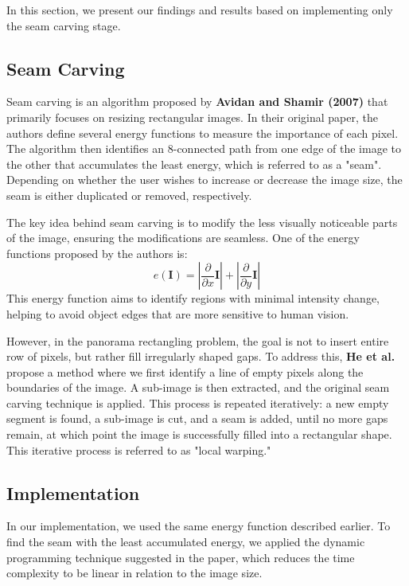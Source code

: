 In this section, we present our findings and results based on implementing only 
the seam carving stage. 

\subsection{Seam Carving}

Seam carving is an algorithm proposed by \textbf{Avidan and Shamir (2007)} that 
primarily focuses on resizing rectangular images. In their original paper, the 
authors define several energy functions to measure the importance of each pixel. 
The algorithm then identifies an 8-connected path from one edge of the image to 
the other that accumulates the least energy, which is referred to as a "seam". 
Depending on whether the user wishes to increase or decrease the image size, the 
seam is either duplicated or removed, respectively. 

The key idea behind seam carving is to modify the less visually noticeable parts
of the image, ensuring the modifications are seamless. One of the energy 
functions proposed by the authors is:
$$
    e(\mathbf I) = \left| \frac{\partial}{\partial x} \mathbf I\right| + 
    \left| \frac{\partial}{\partial y} \mathbf I\right|
$$  
This energy function aims to identify regions with minimal intensity change, 
helping to avoid object edges that are more sensitive to human vision. 

However, in the panorama rectangling problem, the goal is not to insert entire 
row of pixels, but rather fill irregularly shaped gaps. To address this, 
\textbf{He et al.} propose a method where we first identify a line of 
empty pixels along the boundaries of the image. A sub-image is then extracted, 
and the original seam carving technique is applied. This process is repeated 
iteratively: a new empty segment is found, a sub-image is cut, and a seam is 
added, until no more gaps remain, at which point the image is successfully 
filled into a rectangular shape. This iterative process is referred to as 
"local warping."

\subsection{Implementation}

In our implementation, we used the same energy function described earlier. To 
find the seam with the least accumulated energy, we applied the dynamic 
programming technique suggested in the paper, which reduces the time complexity 
to be linear in relation to the image size.

